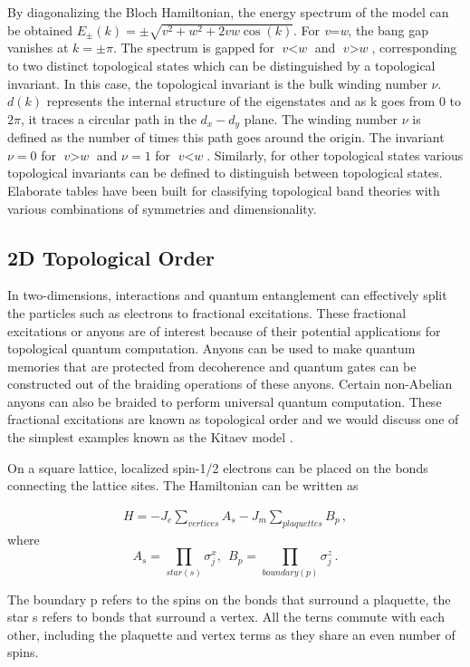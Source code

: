 By diagonalizing the Bloch Hamiltonian, the energy spectrum of the model can be obtained $E_{\pm}(k) = \pm \sqrt{v^2 + w^2 +2 v w \cos(k)} $. For \textit{v}=\textit{w}, the bang gap vanishes at $k=\pm \pi$. The spectrum is gapped for $\textit{v}<\textit{w}$ and $\textit{v}>\textit{w}$, corresponding to two distinct topological states which can be distinguished by a topological invariant. In this case, the topological invariant is the bulk winding number $\nu$. $d(k)$ represents the internal structure of the eigenstates and as k goes from 0 to $2 \pi$, it traces a circular path in the $d_x-d_y$ plane. The winding number $\nu$ is defined as the number of times this path goes around the origin. The invariant $\nu = 0$ for $\textit{v}>\textit{w}$ and $\nu = 1$ for $\textit{v}<\textit{w}$. Similarly, for other topological states various topological invariants can be defined to distinguish between topological states. Elaborate tables have been built for classifying topological band theories with various combinations of symmetries and dimensionality.

\subsection{2D Topological Order}
In two-dimensions, interactions and quantum entanglement can effectively split the particles such as electrons to fractional excitations. These fractional excitations or anyons are of interest because of their potential applications for topological quantum computation. Anyons can be used to make quantum memories that are protected from decoherence and quantum gates can be constructed out of the braiding operations of these anyons. Certain non-Abelian anyons can also be braided to perform universal quantum computation. These fractional excitations are known as topological order and we would discuss one of the simplest examples known as the Kitaev model \cite{Kitaev06}. 

On a square lattice, localized spin-1/2 electrons can be placed on the bonds connecting the lattice sites. The Hamiltonian can be written as

\begin{align}
H = - J_e \sum_{vertices} A_s - J_m \sum_{plaquettes} B_p \,,
\label{Kitaev}
\end{align}
where $$A_s = \prod_{star(s)} \sigma_j^x,~~ B_p = \prod_{boundary(p)} \sigma_j^z \,.$$ 

The boundary p refers to the spins on the bonds that surround a plaquette, the star s refers to bonds that surround a vertex. All the terns commute with each other, including the plaquette and vertex terms as they share an even number of spins. 

